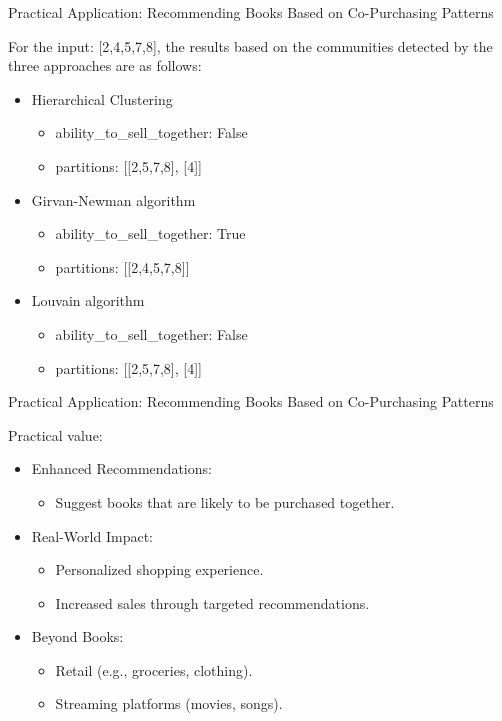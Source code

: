 \documentclass[compress]{beamer}
\begin{document}
\begin{frame}[t]{Practical Application: Recommending Books Based on Co-Purchasing Patterns}

For the input:  [2,4,5,7,8], the results based on the communities detected by the three approaches are as follows:
\begin{itemize}
    \item Hierarchical Clustering
    \begin{itemize}
        \item ability\_to\_sell\_together: False
        \item partitions: [[2,5,7,8], [4]]
    \end{itemize}
    \item Girvan-Newman algorithm
    \begin{itemize}
        \item ability\_to\_sell\_together: True
        \item partitions: [[2,4,5,7,8]]
    \end{itemize}
    \item Louvain algorithm
    \begin{itemize}
        \item ability\_to\_sell\_together: False
        \item partitions: [[2,5,7,8], [4]]
    \end{itemize}
\end{itemize}

\end{frame}

\begin{frame}[t]{Practical Application: Recommending Books Based on Co-Purchasing Patterns}

Practical value:
\begin{itemize}
    \item Enhanced Recommendations:
    \begin{itemize}
        \item Suggest books that are likely to be purchased together.
    \end{itemize}
    \item Real-World Impact:
    \begin{itemize}
        \item Personalized shopping experience.
        \item Increased sales through targeted recommendations.
    \end{itemize}
    \item Beyond Books:
    \begin{itemize}
        \item Retail (e.g., groceries, clothing).
        \item Streaming platforms (movies, songs).
    \end{itemize}
\end{itemize}
\end{frame}
\end{document}
